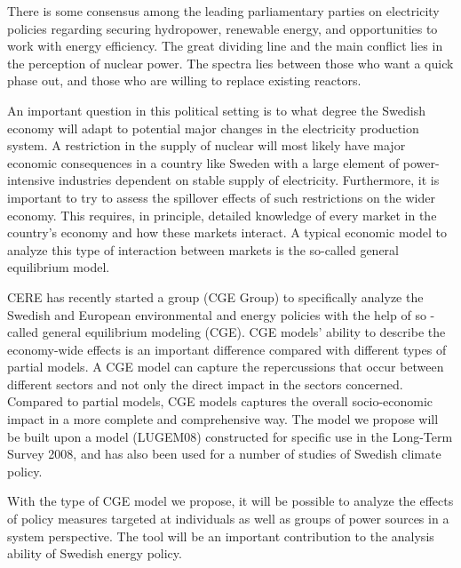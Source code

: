 There is some consensus among the leading parliamentary parties on electricity policies regarding securing hydropower, renewable energy, and opportunities to work with energy efficiency. The great dividing line and the main conflict lies in the perception of nuclear power. The spectra lies between those who want a quick phase out, and those who are willing to replace existing reactors.

An important question in this political setting is to what degree the Swedish economy will adapt to potential major changes in the electricity production system. A restriction in the supply of nuclear will most likely have major economic consequences in a country like Sweden with a large element of power-intensive industries dependent on stable supply of electricity. Furthermore, it is important to try to assess the spillover effects of such restrictions on the wider economy. This requires, in principle, detailed knowledge of every market in the country's economy and how these markets interact. A typical economic model to analyze this type of interaction between markets is the so-called general equilibrium model.

CERE has recently started a group (CGE Group) to specifically analyze the Swedish and European environmental and energy policies with the help of so -called general equilibrium modeling (CGE). CGE models' ability to describe the economy-wide effects is an important difference compared with different types of partial models. A CGE model can capture the repercussions that occur between different sectors and not only the direct impact in the sectors concerned. Compared to partial models, CGE models captures the overall socio-economic impact in a more complete and comprehensive way. The model we propose will be built upon a model (LUGEM08) constructed for specific use in the Long-Term Survey 2008, and has also been used for a number of studies of Swedish climate policy.

With the type of CGE model we propose, it will be possible to analyze the effects of policy measures targeted at individuals as well as groups of power sources in a system perspective. The tool will be an important contribution to the analysis ability of Swedish energy policy.

